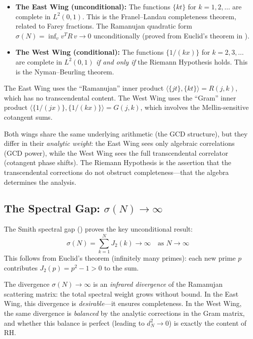 \begin{principle}
\begin{itemize}
  \item \textbf{The East Wing (unconditional):} The functions
    $\{kt\}$ for $k = 1, 2, \ldots$ are complete in $L^2(0,1)$.
    This is the Franel--Landau completeness theorem, related to
    Farey fractions. The Ramanujan quadratic form
    $\sigma(N) = \inf_v v^T R\, v \to 0$ unconditionally
    (proved from Euclid's theorem in ).

  \item \textbf{The West Wing (conditional):} The functions
    $\{1/(kx)\}$ for $k = 2, 3, \ldots$ are complete in $L^2(0,1)$
    \emph{if and only if} the Riemann Hypothesis holds. This is the
    Nyman--Beurling theorem.
\end{itemize}

The East Wing uses the ``Ramanujan'' inner product
$\langle \{jt\}, \{kt\} \rangle = R(j,k)$, which has no transcendental
content. The West Wing uses the ``Gram'' inner product
$\langle \{1/(jx)\}, \{1/(kx)\} \rangle = G(j,k)$, which
involves the Mellin-sensitive cotangent sums.

Both wings share the same underlying arithmetic (the GCD structure),
but they differ in their \emph{analytic weight}: the East Wing
sees only algebraic correlations (GCD power), while the West Wing
sees the full transcendental correlator (cotangent phase shifts).
The Riemann Hypothesis is the assertion that the transcendental
corrections do not obstruct completeness---that the algebra
determines the analysis.
\end{principle}

\subsection{The Spectral Gap: $\sigma(N) \to \infty$}

The Smith spectral gap () proves the key
unconditional result:
\begin{equation}
  \sigma(N) = \sum_{k=1}^{N} J_2(k) \to \infty
  \quad\text{as } N \to \infty
  \label{eq:sigma-diverges}
\end{equation}
This follows from Euclid's theorem (infinitely many primes): each
new prime $p$ contributes $J_2(p) = p^2 - 1 > 0$ to the sum.

\begin{correspondence}
The divergence $\sigma(N) \to \infty$ is an \emph{infrared divergence}
of the Ramanujan scattering matrix: the total spectral weight
grows without bound. In the East Wing, this divergence is
\emph{desirable}---it ensures completeness. In the West Wing,
the same divergence is \emph{balanced} by the analytic corrections
in the Gram matrix, and whether this balance is perfect
(leading to $d_N^2 \to 0$) is exactly the content of RH.
\end{correspondence}

